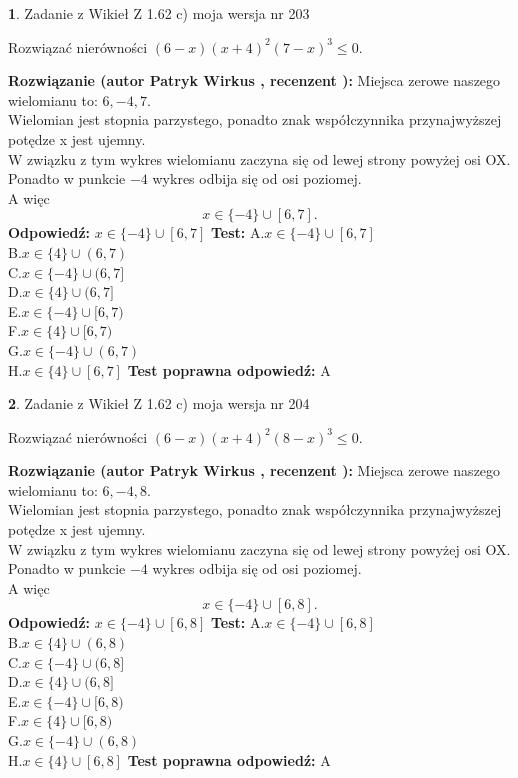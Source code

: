 \documentclass[12pt, a4paper]{article}
\theoremstyle{definition} %
\newtheorem{zad}{}
\newcommand{\zadStart}[1]{\begin{zad}#1\newline}
\newcommand{\zadStop}{\end{zad}}
\newcommand{\rozwStart}[2]{\noindent \textbf{Rozwiązanie (autor #1 , recenzent #2): }\newline}
\newcommand{\rozwStop}{\newline}
\newcommand{\odpStart}{\noindent \textbf{Odpowiedź:}\newline}
\newcommand{\odpStop}{\newline}
\newcommand{\testStart}{\noindent \textbf{Test:}\newline}
\newcommand{\testStop}{\newline}
\newcommand{\kluczStart}{\noindent \textbf{Test poprawna odpowiedź:}\newline}
\newcommand{\kluczStop}{\newline}
\begin{document}
\zadStart{Zadanie z Wikieł Z 1.62 c) moja wersja nr 203}

Rozwiązać nierówności $(6-x)(x+4)^{2}(7-x)^{3}\le0$.
\zadStop
\rozwStart{Patryk Wirkus}{}
Miejsca zerowe naszego wielomianu to: $6, -4, 7$.\\
Wielomian jest stopnia parzystego, ponadto znak współczynnika przy\linebreak najwyższej potędze x jest ujemny.\\ W związku z tym wykres wielomianu zaczyna się od lewej strony powyżej osi OX.\\
Ponadto w punkcie $-4$ wykres odbija się od osi poziomej.\\
A więc $$x \in \{-4\} \cup [6,7].$$
\rozwStop
\odpStart
$x \in \{-4\} \cup [6,7]$
\odpStop
\testStart
A.$x \in \{-4\} \cup [6,7]$\\
B.$x \in \{4\} \cup (6,7)$\\
C.$x \in \{-4\} \cup (6,7]$\\
D.$x \in \{4\} \cup (6,7]$\\
E.$x \in \{-4\} \cup [6,7)$\\
F.$x \in \{4\} \cup [6,7)$\\
G.$x \in \{-4\} \cup (6,7)$\\
H.$x \in \{4\} \cup [6,7]$
\testStop
\kluczStart
A
\kluczStop



\zadStart{Zadanie z Wikieł Z 1.62 c) moja wersja nr 204}

Rozwiązać nierówności $(6-x)(x+4)^{2}(8-x)^{3}\le0$.
\zadStop
\rozwStart{Patryk Wirkus}{}
Miejsca zerowe naszego wielomianu to: $6, -4, 8$.\\
Wielomian jest stopnia parzystego, ponadto znak współczynnika przy\linebreak najwyższej potędze x jest ujemny.\\ W związku z tym wykres wielomianu zaczyna się od lewej strony powyżej osi OX.\\
Ponadto w punkcie $-4$ wykres odbija się od osi poziomej.\\
A więc $$x \in \{-4\} \cup [6,8].$$
\rozwStop
\odpStart
$x \in \{-4\} \cup [6,8]$
\odpStop
\testStart
A.$x \in \{-4\} \cup [6,8]$\\
B.$x \in \{4\} \cup (6,8)$\\
C.$x \in \{-4\} \cup (6,8]$\\
D.$x \in \{4\} \cup (6,8]$\\
E.$x \in \{-4\} \cup [6,8)$\\
F.$x \in \{4\} \cup [6,8)$\\
G.$x \in \{-4\} \cup (6,8)$\\
H.$x \in \{4\} \cup [6,8]$
\testStop
\kluczStart
A
\kluczStop
\end{document}
